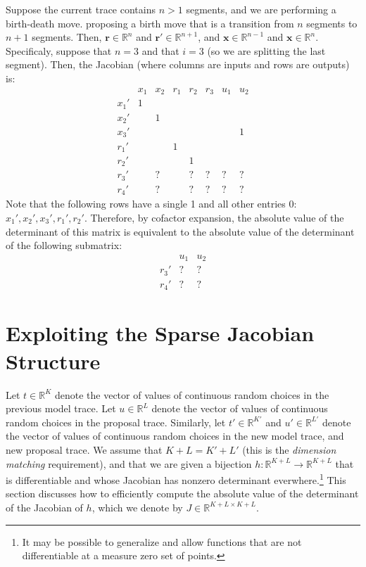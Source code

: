 \documentclass{article}
\begin{document}
Suppose the current trace contains $n > 1$ segments, and we are performing a birth-death move.
proposing a birth move that is a transition from $n$ segments to $n+1$ segments.
Then, $\mathbf{r} \in \mathbb{R}^n$ and $\mathbf{r}' \in \mathbb{R}^{n+1}$, and $\mathbf{x} \in \mathbb{R}^{n-1}$ and $\mathbf{x} \in \mathbb{R}^n$.
Specificaly, suppose that $n = 3$ and that $i = 3$ (so we are splitting the last segment).
Then, the Jacobian (where columns are inputs and rows are outputs) is:
\[
\begin{array}{c|ccccccc}
&       x_1 & x_2 & r_1 &   r_2 &   r_3 &   u_1 &   u_2 \\
\hline
x_1'  & 1   &     &     &       &       &       &       \\
x_2'  &     & 1   &     &       &       &       &       \\
x_3'  &     &     &     &       &       &       &   1   \\
r_1'  &     &     & 1   &       &       &       &       \\
r_2'  &     &     &     &   1   &       &       &       \\
r_3'  &     & ?   &     &   ?   &   ?   &   ?   &   ?   \\
r_4'  &     & ?   &     &   ?   &   ?   &   ?   &   ?   
\end{array}
\]
Note that the following rows have a single 1 and all other entries 0: $x_1', x_2', x_3', r_1', r_2'$.
Therefore, by cofactor expansion, the absolute value of the determinant of this matrix is equivalent to the absolute value of the determinant of the following submatrix:
\[
\begin{array}{c|ccccccc}
&       u_1 &   u_2 \\
\hline
r_3'  & ?   &   ?   \\
r_4'  & ?   &   ?   
\end{array}
\]

\section{Exploiting the Sparse Jacobian Structure}

Let $t \in \mathbb{R}^K$ denote the vector of values of continuous random choices in the previous model trace.
Let $u \in \mathbb{R}^L$ denote the vector of values of continuous random choices in the proposal trace.
Similarly, let $t' \in \mathbb{R}^{K'}$ and $u' \in \mathbb{R}^{L'}$ denote the vector of values of continuous random choices in the new model trace, and new proposal trace.
We assume that $K + L = K' + L'$ (this is the \emph{dimension matching} requirement), and that we are given a bijection $h : \mathbb{R}^{K + L} \to \mathbb{R}^{K + L}$ that is differentiable and whose Jacobian has nonzero determinant everwhere.\footnote{It may be possible to generalize and allow functions that are not differentiable at a measure zero set of points.}
This section discusses how to efficiently compute the absolute value of the determinant of the Jacobian of $h$, which we denote by $J \in \mathbb{R}^{K + L \times K + L}$.
\end{document}
